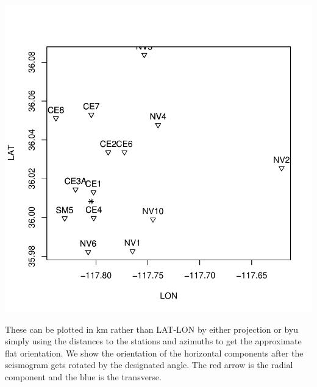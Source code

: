 \documentclass{article}
\begin{document}
\begin{Schunk}
\end{Schunk}
\includegraphics{hodo-006}

These can be plotted in km rather than LAT-LON by either projection
or byu simply using the distances 
to the stations and azimuths to get the approximate flat orientation.
We show the orientation of the horizontal components after the seismogram gets rotated by
the designated angle.  The red arrow is the radial component and the blue
is the transverse.
\end{document}
